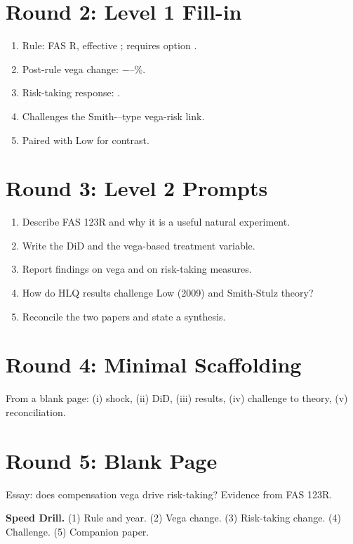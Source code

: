 \documentclass[11pt]{article}
\newcommand{\blank}[1]{\underline{\hspace{#1}}}
\begin{document}
\section*{Round 2: Level 1 Fill-in}
\begin{enumerate}
\item Rule: FAS \blank{1cm}R, effective \blank{1cm}; requires option \blank{2cm}.
\item Post-rule vega change: $-$\blank{1cm}--\blank{1cm}\%.
\item Risk-taking response: \blank{1cm}.
\item Challenges the Smith-\blank{1cm}--type vega-risk link.
\item Paired with Low \blank{1cm} for contrast.
\end{enumerate}

\section*{Round 3: Level 2 Prompts}
\begin{enumerate}
\item Describe FAS 123R and why it is a useful natural experiment.
\item Write the DiD and the vega-based treatment variable.
\item Report findings on vega and on risk-taking measures.
\item How do HLQ results challenge Low (2009) and Smith-Stulz theory?
\item Reconcile the two papers and state a synthesis.
\end{enumerate}

\section*{Round 4: Minimal Scaffolding}
From a blank page: (i) shock, (ii) DiD, (iii) results, (iv) challenge to theory, (v) reconciliation.

\section*{Round 5: Blank Page}
Essay: does compensation vega drive risk-taking? Evidence from FAS 123R.

\vspace{6pt}
\begin{drillbox}
\textbf{Speed Drill.} (1) Rule and year. (2) Vega change. (3) Risk-taking change. (4) Challenge. (5) Companion paper.
\end{drillbox}
\end{document}
